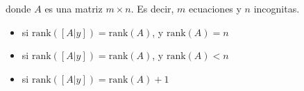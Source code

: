 \documentclass[letterpaper,10pt,english]{jupyterBook}
\begin{document}
donde \(A\) es una matriz \(m\times n\). Es decir, \(m\) ecuaciones y \(n\) incognitas.
\begin{itemize}
\item {} 
\sphinxAtStartPar
{} si \(\mathrm{rank}\left([A|y]\right) = \mathrm{rank}\left(A\right)\), y \(\mathrm{rank}\left(A\right) = n\)

\item {} 
\sphinxAtStartPar
{} si \(\mathrm{rank}\left([A|y]\right) = \mathrm{rank}\left(A\right)\), y \(\mathrm{rank}\left(A\right) < n\)

\item {} 
\sphinxAtStartPar
{} si \(\mathrm{rank}\left([A|y]\right) = \mathrm{rank}\left(A\right) + 1\)

\end{itemize}
\end{document}
